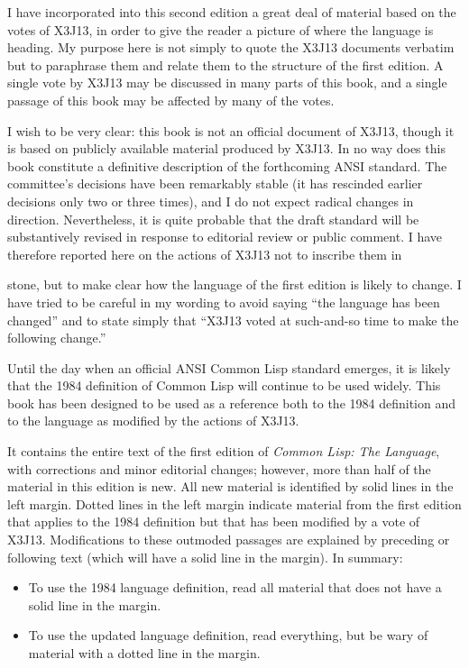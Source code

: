 I have incorporated into this second edition
a great deal of material based on the votes of X3J13,
in order to give the reader a picture of where the language is heading.
My purpose here is not simply to quote the X3J13 documents verbatim
but to paraphrase them and relate them to the structure of the first
edition.  A single vote by X3J13 may be discussed in many parts of this book,
and a single passage of this book may be affected by many of the votes.

I wish to be very clear: this book is not an official document
of X3J13, though it is based on publicly available material
produced by X3J13.  In no way does this book constitute a definitive
description of the forthcoming ANSI standard.  The
committee's decisions have been remarkably stable (it has rescinded
earlier decisions only two or three times), and I do not
expect radical changes in direction.
Nevertheless, it is quite probable
that the draft standard will be substantively revised in response to
editorial review or public comment.
I have therefore reported here on the actions of X3J13 not to
inscribe them in \strut stone, but to make clear how the language
of the first edition is likely to change.
I have tried to be careful
in my wording to avoid saying ``the language has been changed''
and to state simply that
``X3J13 voted at such-and-so time to make the following change.''

Until the day when an official ANSI Common Lisp standard emerges,
it is likely that the 1984 definition of Common Lisp will
continue to be used widely.  This book has been designed
to be used as a reference both to the 1984 definition
and to the language as modified by the actions of X3J13.

It contains the entire text of the first edition
of {\it Common Lisp: The Language}, with corrections
and minor editorial changes;
however, more than half of the material in this edition is new.
All new material is
identified by solid lines
in the left margin.
Dotted lines in the left margin indicate material from the first edition
that applies to the 1984 definition but that has been modified
by a vote of X3J13.  Modifications to these outmoded
passages are explained by preceding or following text (which will
have a solid line in the margin).
In summary:
\begin{itemize}
\item To use the 1984 language definition, read all material that does not
have a solid line in the margin.
\item To use the updated language definition, read everything, but
be wary of material with a dotted line in the margin.
\end{itemize}


